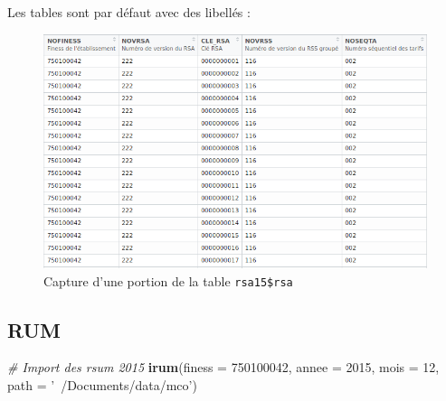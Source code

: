 \documentclass[]{book}
\newenvironment{Shaded}{\begin{snugshade}}{\end{snugshade}}
\newcommand{\KeywordTok}[1]{\textcolor[rgb]{0.13,0.29,0.53}{\textbf{{#1}}}}
\newcommand{\DataTypeTok}[1]{\textcolor[rgb]{0.13,0.29,0.53}{{#1}}}
\newcommand{\DecValTok}[1]{\textcolor[rgb]{0.00,0.00,0.81}{{#1}}}
\newcommand{\StringTok}[1]{\textcolor[rgb]{0.31,0.60,0.02}{{#1}}}
\newcommand{\CommentTok}[1]{\textcolor[rgb]{0.56,0.35,0.01}{\textit{{#1}}}}
\newcommand{\NormalTok}[1]{{#1}}
\begin{document}
\begin{Shaded}
\end{Shaded}

Les tables sont par défaut avec des libellés :

\begin{figure}[htbp]
\centering
\includegraphics{images/rsa1.png}
\caption{Capture d'une portion de la table \texttt{rsa15\$rsa}}
\end{figure}

\subsection{RUM}\label{rum}

\begin{Shaded}
\begin{Highlighting}[]
\CommentTok{# Import des rsum 2015}
\KeywordTok{irum}\NormalTok{(}\DataTypeTok{finess =} \DecValTok{750100042}\NormalTok{, }
     \DataTypeTok{annee =} \DecValTok{2015}\NormalTok{, }
     \DataTypeTok{mois =} \DecValTok{12}\NormalTok{, }
     \DataTypeTok{path =} \StringTok{'~/Documents/data/mco'}\NormalTok{)}
\end{Highlighting}
\end{Shaded}
\end{document}
